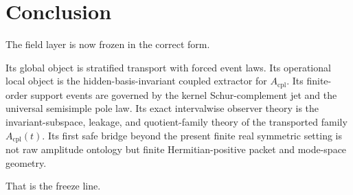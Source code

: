 \documentclass[11pt,a4paper]{article}
\numberwithin{equation}{section}
\theoremstyle{thmcompact}
\theoremstyle{remark}
\begin{document}
\section{Conclusion}

The field layer is now frozen in the correct form.

Its global object is stratified transport with forced event laws. Its operational local object is the hidden-basis-invariant coupled extractor for $A_{\mathrm{cpl}}$. Its finite-order support events are governed by the kernel Schur-complement jet and the universal semisimple pole law. Its exact intervalwise observer theory is the invariant-subspace, leakage, and quotient-family theory of the transported family $A_{\mathrm{cpl}}(t)$. Its first safe bridge beyond the present finite real symmetric setting is not raw amplitude ontology but finite Hermitian-positive packet and mode-space geometry.

That is the freeze line.
\end{document}
